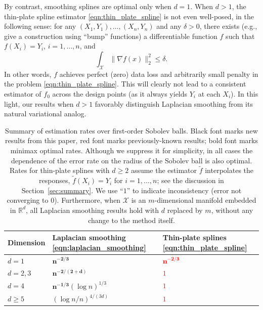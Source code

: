 \documentclass[twoside]{article}
\newcommand{\Reals}{\mathbb{R}}
\newcommand{\1}{\mathbf{1}}
\newcommand{\Rd}{\Reals^d}
\newcommand{\Xset}{\mathcal{X}}
\newcommand{\wt}[1]{\widetilde{#1}}
\theoremstyle{definition}
\theoremstyle{remark}
\begin{document}
By contrast, smoothing splines are optimal only when $d=1$. When $d>1$, the thin-plate spline estimator \eqref{eqn:thin_plate_spline} is not even well-posed, in the following sense: for any $(X_1,Y_1),\ldots,(X_n,Y_n)$ and any $\delta>0$, there exists (e.g., \citet{green93} give a construction using ``bump'' functions) a differentiable function $f$ such that $f(X_i) = Y_i$, $i=1,\ldots,n$, and
\begin{equation*}
\int_{\Xset} \|\nabla f(x)\|_2^2 \leq \delta.
\end{equation*}
In other words, $f$ achieves perfect (zero) data loss and arbitrarily small penalty in the problem \eqref{eqn:thin_plate_spline}. This will clearly not lead to a consistent estimator of $f_0$ across the design points (as it always yields $Y_i$ at each $X_i$). In this light, our results when $d>1$ favorably distinguish Laplacian smoothing from its natural variational analog.

\begin{table}
	\begin{center}
		\begin{tabular}{p{} | p{} p{} }
			Dimension & Laplacian smoothing \eqref{eqn:laplacian_smoothing} & Thin-plate splines \eqref{eqn:thin_plate_spline} \\
			\hline
			$d = 1$ & $\bm{n^{-2/3}}$ & \textcolor{red}{$\bm{n^{-2/3}}$} \\
			$d = 2,3$ & $\bm{n^{-2/(2 + d)}}$ & \textcolor{red}{$1$} \\
			$d = 4$ & $\bm{n^{-1/3}} (\log n)^{1/3}$ & \textcolor{red}{$1$} \\
			$d \geq 5$  & $(\log n/n)^{4/(3d)}$ &\textcolor{red}{$1$} \\
		\end{tabular}
	\end{center}
	\caption{Summary of estimation rates over first-order Sobolev balls. Black font marks new results from this paper, red font marks previously-known results; bold font marks minimax optimal rates. Although we suppress it for simplicity, in all cases the dependence of the error rate on the radius of the Sobolev ball is also optimal. Rates for thin-plate splines with $d \geq 2$ assume the estimator $\wt{f}$ interpolates the responses, $\wt{f}(X_i) = Y_i$ for $i = 1,\ldots,n$; see the discussion in Section~\ref{sec:summary}. We use ``$1$'' to indicate inconsistency (error not converging to 0). Furthermore, when $\Xset$ is an $m$-dimensional manifold embedded in $\Rd$, all Laplacian smoothing results hold with $d$ replaced by $m$, without any change to the method itself.}
	\label{tbl:estimation_rates}
\end{table}
\end{document}
